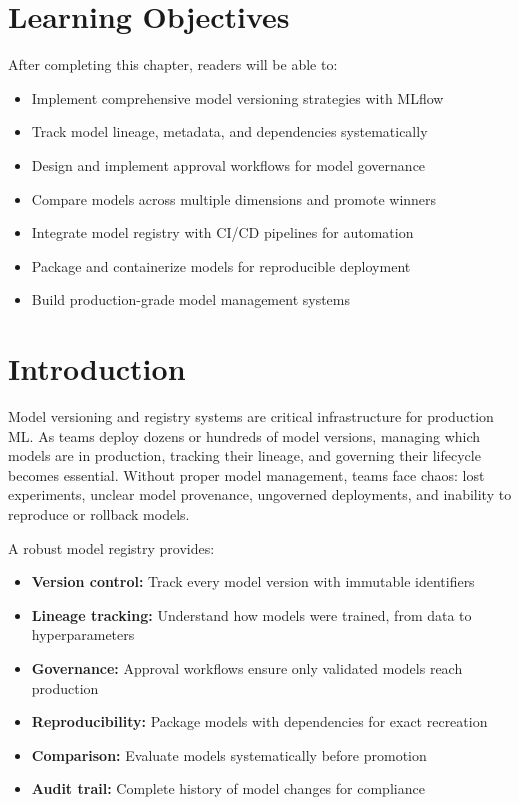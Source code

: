 \section{Learning Objectives}

After completing this chapter, readers will be able to:
\begin{itemize}
    \item Implement comprehensive model versioning strategies with MLflow
    \item Track model lineage, metadata, and dependencies systematically
    \item Design and implement approval workflows for model governance
    \item Compare models across multiple dimensions and promote winners
    \item Integrate model registry with CI/CD pipelines for automation
    \item Package and containerize models for reproducible deployment
    \item Build production-grade model management systems
\end{itemize}

\section{Introduction}

Model versioning and registry systems are critical infrastructure for production ML. As teams deploy dozens or hundreds of model versions, managing which models are in production, tracking their lineage, and governing their lifecycle becomes essential. Without proper model management, teams face chaos: lost experiments, unclear model provenance, ungoverned deployments, and inability to reproduce or rollback models.

A robust model registry provides:
\begin{itemize}
    \item \textbf{Version control:} Track every model version with immutable identifiers
    \item \textbf{Lineage tracking:} Understand how models were trained, from data to hyperparameters
    \item \textbf{Governance:} Approval workflows ensure only validated models reach production
    \item \textbf{Reproducibility:} Package models with dependencies for exact recreation
    \item \textbf{Comparison:} Evaluate models systematically before promotion
    \item \textbf{Audit trail:} Complete history of model changes for compliance
\end{itemize}

